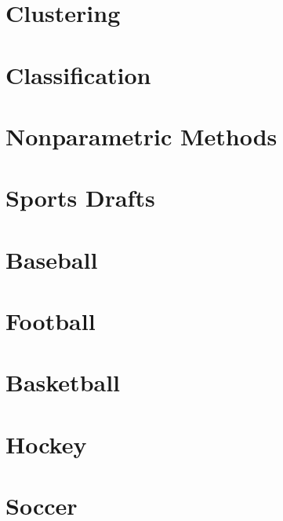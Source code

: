 \documentclass[
  11pt,
]{book}
\theoremstyle{definition}
\theoremstyle{definition}
\theoremstyle{definition}
\theoremstyle{definition}
\theoremstyle{remark}
\begin{document}
\hypertarget{clustering}{%
\chapter{Clustering}\label{clustering}}

\hypertarget{classification}{%
\chapter{Classification}\label{classification}}

\hypertarget{nonparametric-methods}{%
\chapter{Nonparametric Methods}\label{nonparametric-methods}}

\hypertarget{sports-drafts}{%
\chapter{Sports Drafts}\label{sports-drafts}}

\hypertarget{baseball-1}{%
\chapter{Baseball}\label{baseball-1}}

\hypertarget{football-1}{%
\chapter{Football}\label{football-1}}

\hypertarget{basketball-1}{%
\chapter{Basketball}\label{basketball-1}}

\hypertarget{hockey-1}{%
\chapter{Hockey}\label{hockey-1}}

\hypertarget{soccer-1}{%
\chapter{Soccer}\label{soccer-1}}

  
\end{document}
